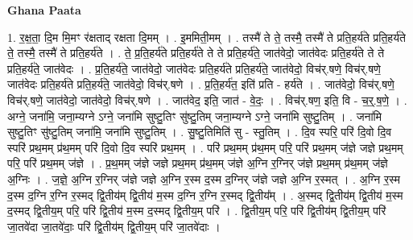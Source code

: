\documentclass[17pt]{extarticle}
\begin{document}
\textbf{Ghana Paata } \newline

1. र॒क्ष॒ता॒ दि॒म मि॒मꣳ र॑क्षताद् रक्षता दि॒मम् । . इ॒ममिती॒मम् । . तस्मै॑ ते ते॒ तस्मै॒ तस्मै॑ ते प्रति॒हर्य॑ते प्रति॒हर्य॑ते ते॒ तस्मै॒ तस्मै॑ ते प्रति॒हर्य॑ते । . ते॒ प्र॒ति॒हर्य॑ते प्रति॒हर्य॑ते ते ते प्रति॒हर्य॑ते॒ जात॑वेदो॒ जात॑वेदः प्रति॒हर्य॑ते ते ते प्रति॒हर्य॑ते॒ जात॑वेदः । . प्र॒ति॒हर्य॑ते॒ जात॑वेदो॒ जात॑वेदः प्रति॒हर्य॑ते प्रति॒हर्य॑ते॒ जात॑वेदो॒ विच॑र्.षणे॒ विच॑र्.षणे॒ जात॑वेदः प्रति॒हर्य॑ते प्रति॒हर्य॑ते॒ जात॑वेदो॒ विच॑र्.षणे । . प्र॒ति॒हर्य॑त॒ इति॑ प्रति - हर्य॑ते । . जात॑वेदो॒ विच॑र्.षणे॒ विच॑र्.षणे॒ जात॑वेदो॒ जात॑वेदो॒ विच॑र्.षणे । . जात॑वेद॒ इति॒ जात॑ - वे॒दः॒ । . विच॑र्.षण॒ इति॒ वि - च॒र्॒.ष॒णे॒ । . अग्ने॒ जना॑मि॒ जना॒म्यग्ने ऽग्ने॒ जना॑मि सुष्टु॒तिꣳ सु॑ष्टु॒तिम् जना॒म्यग्ने ऽग्ने॒ जना॑मि सुष्टु॒तिम् । . जना॑मि सुष्टु॒तिꣳ सु॑ष्टु॒तिम् जना॑मि॒ जना॑मि सुष्टु॒तिम् । . सु॒ष्टु॒तिमिति॑ सु - स्तु॒तिम् । . दि॒व स्परि॒ परि॑ दि॒वो दि॒व स्परि॑ प्रथ॒मम् प्र॑थ॒मम् परि॑ दि॒वो दि॒व स्परि॑ प्रथ॒मम् । . परि॑ प्रथ॒मम् प्र॑थ॒मम् परि॒ परि॑ प्रथ॒मम् ज॑ज्ञे जज्ञे प्रथ॒मम् परि॒ परि॑ प्रथ॒मम् ज॑ज्ञे । . प्र॒थ॒मम् ज॑ज्ञे जज्ञे प्रथ॒मम् प्र॑थ॒मम् ज॑ज्ञे अ॒ग्नि र॒ग्निर् ज॑ज्ञे प्रथ॒मम् प्र॑थ॒मम् ज॑ज्ञे अ॒ग्निः । . ज॒ज्ञे॒ अ॒ग्नि र॒ग्निर् ज॑ज्ञे जज्ञे अ॒ग्नि र॒स्म द॒स्म द॒ग्निर् ज॑ज्ञे जज्ञे अ॒ग्नि र॒स्मत् । . अ॒ग्नि र॒स्म द॒स्म द॒ग्नि र॒ग्नि र॒स्मद् द्वि॒तीय॑म् द्वि॒तीय॑ म॒स्म द॒ग्नि र॒ग्नि र॒स्मद् द्वि॒तीय᳚म् । . अ॒स्मद् द्वि॒तीय॑म् द्वि॒तीय॑ म॒स्म द॒स्मद् द्वि॒तीय॒म् परि॒ परि॑ द्वि॒तीय॑ म॒स्म द॒स्मद् द्वि॒तीय॒म् परि॑ । . द्वि॒तीय॒म् परि॒ परि॑ द्वि॒तीय॑म् द्वि॒तीय॒म् परि॑ जा॒तवे॑दा जा॒तवे॑दाः॒ परि॑ द्वि॒तीय॑म् द्वि॒तीय॒म् परि॑ जा॒तवे॑दाः । \newline
\end{document}
